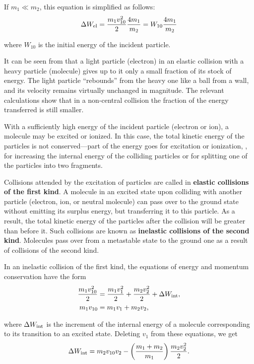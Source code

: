 \noindent
If $m_1\ll m_2$, this equation is simplified as follows:
\begin{equation}\label{eq:12_12}
    \Delta{W_{\text{el}}} = \frac{m_1v_{10}^2}{2} \frac{4 m_1}{m_2} = W_{10}\frac{4 m_1}{m_2}
\end{equation}

\noindent
where $W_{10}$ is the initial energy of the incident particle.

It can be seen from  that a light particle (electron) in an elastic collision with a heavy particle (molecule) gives up to it only a small fraction of its stock of energy.
The light particle ``rebounds'' from the heavy one like a ball from a wall, and its velocity remains virtually unchanged in magnitude.
The relevant calculations show that in a non-central collision the fraction of the energy transferred is still smaller.

With a sufficiently high energy of the incident particle (electron or ion), a molecule may be excited or ionized.
In this case, the total kinetic energy of the particles is not conserved---part of the energy goes for excitation or ionization, \ie, for increasing the internal energy of the colliding particles or for splitting one of the particles into two fragments.

Collisions attended by the excitation of particles are called in \textbf{elastic collisions of the first kind}.
A molecule in an excited state upon colliding with another particle (electron, ion, or neutral molecule) can pass over to the ground state without emitting its surplus energy, but transferring it to this particle.
As a result, the total kinetic energy of the particles after the collision will be greater than before it.
Such collisions are known as \textbf{inelastic collisions of the second kind}.
Molecules pass over from a metastable state to the ground one as a result of collisions of the second kind.

In an inelastic collision of the first kind, the equations of energy and momentum conservation have the form
\begin{align}
    \frac{m_1 v_{10}^2}{2} &= \frac{m_1 v_1^2}{2} + \frac{m_2 v_2^2}{2} + \Delta{W_{\text{int}}}, \label{eq:12_13}\\
    m_1 v_{10} &= m_1 v_1 + m_2 v_2,
\end{align}

\noindent
where $\Delta{W_{\text{int}}}$ is the increment of the internal energy of a molecule corresponding to its transition to an excited state.
Deleting $v_1$ from these equations, we get
\begin{equation}\label{eq:12_14}
    \Delta{W_{\text{int}}} = m_2 v_{10} v_2 - \left(\frac{m_1 + m_2}{m_1}\right) \frac{m_2v_2^2}{2}.
\end{equation}

